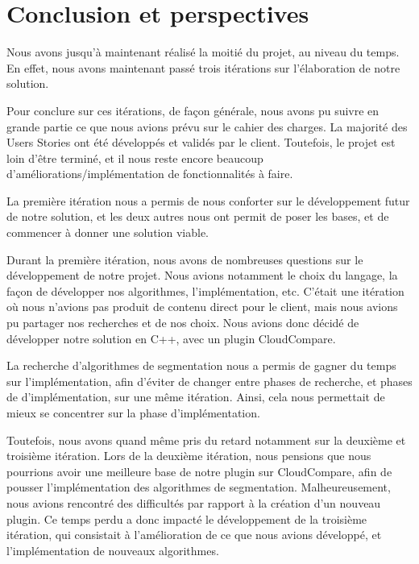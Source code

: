 \documentclass[12pt,titlepage,french]{article}
\begin{document}
\newpage
\section{Conclusion et perspectives}

Nous avons jusqu'à maintenant réalisé la moitié du projet, au niveau du temps. En effet, nous avons maintenant passé trois itérations sur l'élaboration de notre solution. \newline

Pour conclure sur ces itérations, de façon générale, nous avons pu suivre en grande partie ce que nous avions prévu sur le cahier des charges. La majorité des Users Stories ont été développés et validés par le client. Toutefois, le projet est loin d'être terminé, et il nous reste encore beaucoup d'améliorations/implémentation de fonctionnalités à faire.

La première itération nous a permis de nous conforter sur le développement futur de notre solution, et les deux autres nous ont permit de poser les bases, et de commencer à donner une solution viable.

Durant la première itération, nous avons de nombreuses questions sur le développement de notre projet. Nous avions notamment le choix du langage, la façon de développer nos algorithmes, l'implémentation, etc. C'était une itération où nous n'avions pas produit de contenu direct pour le client, mais nous avions pu partager nos recherches et de nos choix. Nous avions donc décidé de développer notre solution en C++, avec un plugin CloudCompare. 

La recherche d'algorithmes de segmentation nous a permis de gagner du temps sur l'implémentation, afin d'éviter de changer entre phases de recherche, et phases de d'implémentation, sur une même itération. Ainsi, cela nous permettait de mieux se concentrer sur la phase d'implémentation. 

Toutefois, nous avons quand même pris du retard notamment sur la deuxième et troisième itération. Lors de la deuxième itération, nous pensions que nous pourrions avoir une meilleure base de notre plugin sur CloudCompare, afin de pousser l'implémentation des algorithmes de segmentation. Malheureusement, nous avions rencontré des difficultés par rapport à la création d'un nouveau plugin. Ce temps perdu a donc impacté le développement de la troisième itération, qui consistait à l'amélioration de ce que nous avions développé, et l'implémentation de nouveaux algorithmes.
\end{document}
